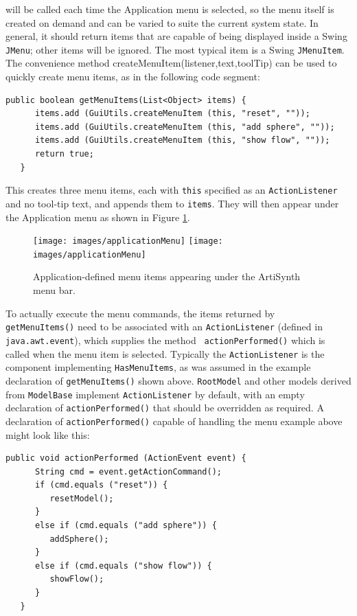 will be called each time the {\sf Application} menu is selected, so the
menu itself is created on demand and can be varied to suite the
current system state. In general, it should return items that are
capable of being displayed inside a Swing {\tt JMenu}; other items
will be ignored. The most typical item is a Swing {\tt JMenuItem}.  The
convenience method
%
{createMenuItem(listener,text,toolTip)}
can be used to quickly create menu items, as in the following
code segment:
%
\begin{lstlisting}[]
   public boolean getMenuItems(List<Object> items) {
      items.add (GuiUtils.createMenuItem (this, "reset", ""));
      items.add (GuiUtils.createMenuItem (this, "add sphere", ""));
      items.add (GuiUtils.createMenuItem (this, "show flow", ""));
      return true;
   }
\end{lstlisting}
%
This creates three menu items, each with {\tt this} specified as an
{\tt ActionListener} and no tool-tip text, and appends them
to {\tt items}. They will then appear under the {\sf Application}
menu as shown in Figure \ref{applicationMenu:fig}.

\begin{figure}[t]
\begin{center}
\iflatexml
 \texttt{[image: images/applicationMenu]}
\else
 \texttt{[image: images/applicationMenu]}
\fi
\end{center}
\caption{Application-defined menu items appearing under the ArtiSynth
menu bar.}
\label{applicationMenu:fig}
\end{figure}

To actually execute the menu commands, the items returned by {\tt
getMenuItems()} need to be associated with an {\tt ActionListener}
(defined in {\tt java.awt.event}), which supplies the method {\tt
actionPerformed()} which is called when the menu item is
selected. Typically the {\tt ActionListener} is the component
implementing {\tt HasMenuItems}, as was assumed in the example
declaration of {\tt getMenuItems()} shown above. {\tt RootModel} and
other models derived from {\tt ModelBase} implement {\tt ActionListener} by
default, with an empty declaration of {\tt actionPerformed()} that
should be overridden as required.
A declaration of {\tt actionPerformed()} capable of handling the menu
example above might look like this:
%
\begin{lstlisting}[]
   public void actionPerformed (ActionEvent event) {
      String cmd = event.getActionCommand();
      if (cmd.equals ("reset")) {
         resetModel();
      }
      else if (cmd.equals ("add sphere")) {
         addSphere();
      }
      else if (cmd.equals ("show flow")) {
         showFlow();
      }
   }
\end{lstlisting}
%

%
\ifdefined\maindoc
\else

\fi
